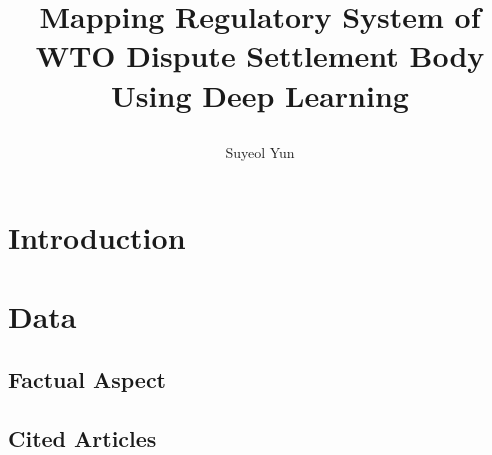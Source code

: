 \documentclass[12pt,letterpaper]{article}
\newcommand{\tit}{
\bf 
Mapping Regulatory System of WTO Dispute Settlement Body Using Deep Learning
}
\newcommand\spacingset[1]{\renewcommand{\baselinestretch}
{#1}\small\normalsize}
\begin{document}
\spacingset{1.25}

\setcounter{page}{0}
\vspace{-.1in}

{\title{
    \tit
  }
  \author{Suyeol Yun
  }
  \maketitle
}

\thispagestyle{empty}
\vspace{-.1in}

\begin{abstract}
\end{abstract}

\spacingset{1.5} %

% 


\section{Introduction}











\section{Data}


% 

\subsection{Factual Aspect}


\subsection{Cited Articles}

\end{document}
